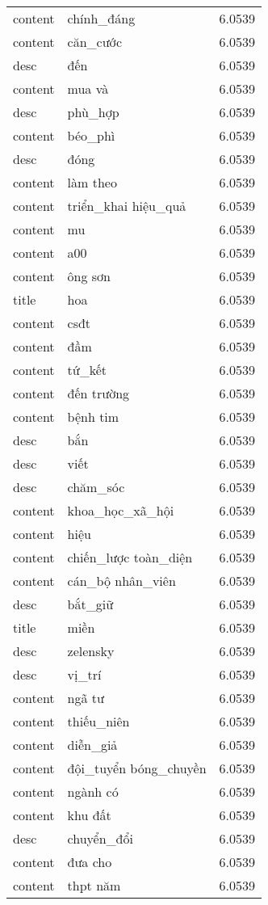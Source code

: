 \documentclass{article}
\begin{document}
\begin{tabular}{lll}
content & chính\_đáng & 6.0539\\
content & căn\_cước & 6.0539\\
desc & đến & 6.0539\\
content & mua và & 6.0539\\
desc & phù\_hợp & 6.0539\\
content & béo\_phì & 6.0539\\
desc & đóng & 6.0539\\
content & làm theo & 6.0539\\
content & triển\_khai hiệu\_quả & 6.0539\\
content & mu & 6.0539\\
content & a00 & 6.0539\\
content & ông sơn & 6.0539\\
title & hoa & 6.0539\\
content & csđt & 6.0539\\
content & đầm & 6.0539\\
content & tứ\_kết & 6.0539\\
content & đến trường & 6.0539\\
content & bệnh tim & 6.0539\\
desc & bắn & 6.0539\\
desc & viết & 6.0539\\
desc & chăm\_sóc & 6.0539\\
content & khoa\_học\_xã\_hội & 6.0539\\
content & hiệu & 6.0539\\
content & chiến\_lược toàn\_diện & 6.0539\\
content & cán\_bộ nhân\_viên & 6.0539\\
desc & bắt\_giữ & 6.0539\\
title & miền & 6.0539\\
desc & zelensky & 6.0539\\
desc & vị\_trí & 6.0539\\
content & ngã tư & 6.0539\\
content & thiếu\_niên & 6.0539\\
content & diễn\_giả & 6.0539\\
content & đội\_tuyển bóng\_chuyền & 6.0539\\
content & ngành có & 6.0539\\
content & khu đất & 6.0539\\
desc & chuyển\_đổi & 6.0539\\
content & đưa cho & 6.0539\\
content & thpt năm & 6.0539\\

\end{tabular}
\end{document}
